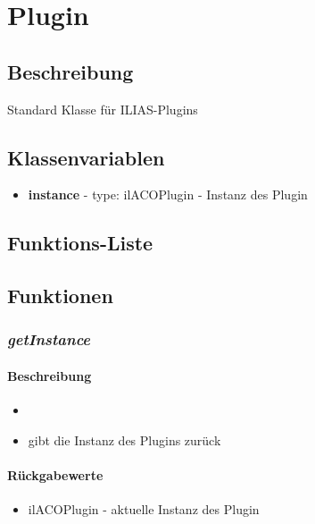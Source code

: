 \section{Plugin}

\subsection*{Beschreibung}
Standard Klasse für ILIAS-Plugins
\subsection*{Klassenvariablen}
\begin{itemize}
	\item[] \textbf{instance} - type: ilACOPlugin - Instanz des Plugin
\end{itemize}

\subsection*{Funktions-Liste}


\paragraph{}
\paragraph{}

\subsection*{Funktionen}

\subsubsection*{\textit{getInstance}}\label{getinstance}
\paragraph{Beschreibung}
\begin{itemize}
	\item[]\noindent{}
	\item[]gibt die Instanz des Plugins zurück
\end{itemize}
\paragraph{Rückgabewerte}
\begin{itemize}
	\item[] ilACOPlugin - aktuelle Instanz des Plugin
\end{itemize}
